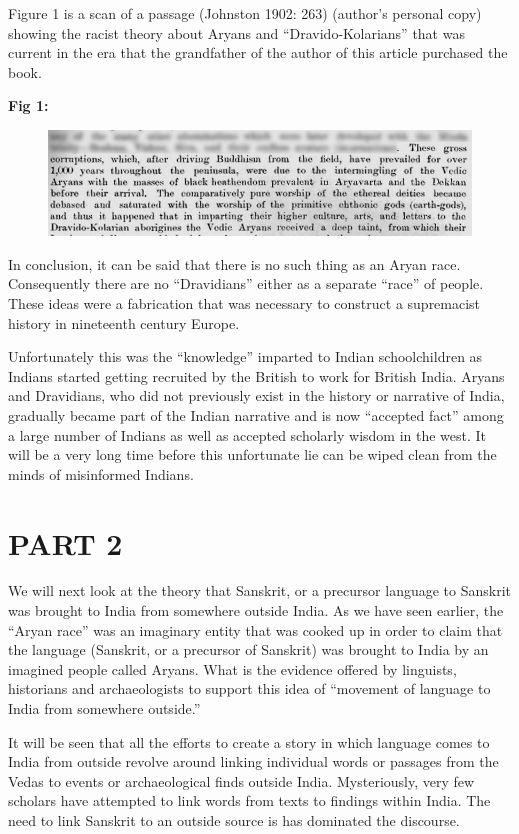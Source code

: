 Figure 1 is a scan of a passage (Johnston 1902: 263) (author’s personal copy) showing the racist theory about Aryans and “Dravido-Kolarians” that was current in the era that the grandfather of the author of this article purchased the book.

\textbf{Fig 1:}

\begin{figure}
\includegraphics{"images/7-01.jpg"}
\end{figure}

In conclusion, it can be said that there is no such thing as an Aryan race. Consequently there are no “Dravidians” either as a separate “race” of people. These ideas were a fabrication that was necessary to construct a supremacist history in nineteenth century Europe.

Unfortunately this was the “knowledge” imparted to Indian schoolchildren as Indians started getting recruited by the British to work for British India. Aryans and Dravidians, who did not previously exist in the history or narrative of India, gradually became part of the Indian narrative and is now “accepted fact” among a large number of Indians as well as accepted scholarly wisdom in the west. It will be a very long time before this unfortunate lie can be wiped clean from the minds of misinformed Indians.


\section*{PART 2}

We will next look at the theory that Sanskrit, or a precursor language to Sanskrit was brought to India from somewhere outside India. As we have seen earlier, the “Aryan race” was an imaginary entity that was cooked up in order to claim that the language (Sanskrit, or a precursor of Sanskrit) was brought to India by an imagined people called Aryans. What is the evidence offered by linguists, historians and archaeologists to support this idea of “movement of language to India from somewhere outside.”

It will be seen that all the efforts to create a story in which language comes to India from outside revolve around linking individual words or passages from the Vedas to events or archaeological finds outside India. Mysteriously, very few scholars have attempted to link words from texts to findings within India. The need to link Sanskrit to an outside source is has dominated the discourse.

